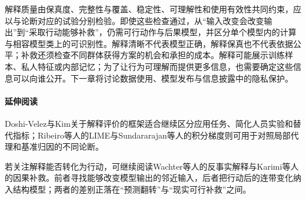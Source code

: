 解释质量由保真度、完整性与覆盖、稳定性、可理解性和使用有效性共同约束，应以与论断对应的试验分别检验。即使这些检查通过，从“输入改变会改变输出”到“采取行动能够补救”，仍需可行动作与后果模型，并区分单个模型内的计算与相容模型类上的可识别性。解释清晰不代表模型正确，解释保真也不代表依据公平；补救还须检查不同群体获得方案的机会和承担的成本。解释可能展示训练样本、私人特征或内部记忆；为了让行为可理解而提供更多信息，也需要确定这些信息可以向谁公开。下一章将讨论数据使用、模型发布与信息披露中的隐私保护。

\paragraph{延伸阅读}

Doshi-Velez与Kim关于解释评价的框架适合继续区分应用任务、简化人员实验和替代指标；Ribeiro等人的LIME与Sundararajan等人的积分梯度则可用于对照局部代理和基准归因的不同论断。

若关注解释能否转化为行动，可继续阅读Wachter等人的反事实解释与Karimi等人的因果补救。前者寻找能够改变模型输出的邻近输入，后者把行动后的连带变化纳入结构模型；两者的差别正落在“预测翻转”与“现实可行补救”之间。

